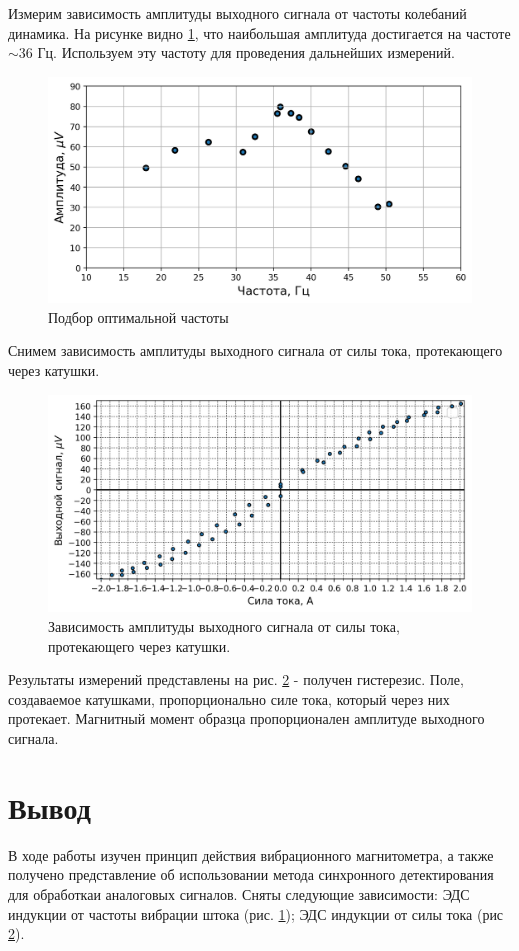 \documentclass[a4paper,12pt]{article} %
\begin{document}
Измерим зависимость амплитуды выходного сигнала от частоты колебаний динамика. На рисунке видно \ref{fig:freq}, что наибольшая амплитуда достигается на частоте $\sim 36 \text{ Гц}$. Используем эту частоту для проведения дальнейших измерений. \\
\begin{figure}[htbp]
    \centering
\includegraphics[width = 1.0 \textwidth]{freq.png}
    \caption{Подбор оптимальной частоты}
    \label{fig:freq}
\end{figure}


\noindent Снимем зависимость амплитуды выходного сигнала от силы тока, протекающего через катушки. \\
\begin{figure}[htbp]
    \centering
    \includegraphics[width = 1.0 \textwidth]{magnetic_curve.png}
    \caption{Зависимость амплитуды выходного сигнала от силы тока, протекающего через катушки.}
    \label{fig:magnetic}
\end{figure}

\noindent Результаты измерений представлены на рис. \ref{fig:magnetic} - получен гистерезис. Поле, создаваемое катушками, пропорционально силе тока, который через них протекает. Магнитный момент образца пропорционален амплитуде выходного сигнала.

\section*{{Вывод}}

В ходе работы изучен принцип действия вибрационного магнитометра, а  также получено представление об использовании метода синхронного детектирования для обработкаи аналоговых сигналов. Сняты следующие зависимости: ЭДС индукции от частоты вибрации штока (рис. \ref{fig:freq}); ЭДС индукции от силы тока (рис \ref{fig:magnetic}).
\end{document}

